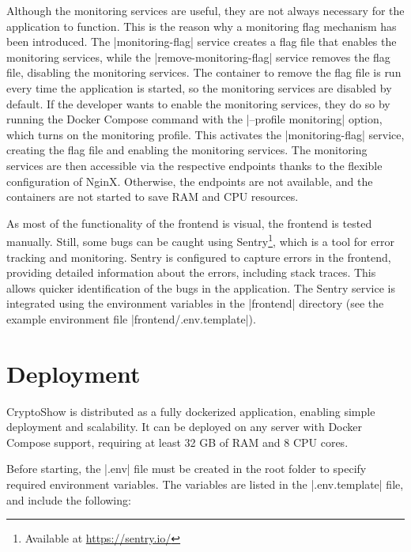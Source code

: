 Although the monitoring services are useful, they are not always necessary for the application to function. This is the reason why a monitoring flag mechanism has been introduced. The \inline|monitoring-flag| service creates a flag file that enables the monitoring services, while the \inline|remove-monitoring-flag| service removes the flag file, disabling the monitoring services. The container to remove the flag file is run every time the application is started, so the monitoring services are disabled by default. If the developer wants to enable the monitoring services, they do so by running the Docker Compose command with the \inline|--profile monitoring| option, which turns on the monitoring profile. This activates the \inline|monitoring-flag| service, creating the flag file and enabling the monitoring services. The monitoring services are then accessible via the respective endpoints thanks to the flexible configuration of NginX. Otherwise, the endpoints are not available, and the containers are not started to save RAM and CPU resources.

As most of the functionality of the frontend is visual, the frontend is tested manually. Still, some bugs can be caught using Sentry\footnote{Available at \url{https://sentry.io/}}, which is a tool for error tracking and monitoring. Sentry is configured to capture errors in the frontend, providing detailed information about the errors, including stack traces. This allows quicker identification of the bugs in the application. The Sentry service is integrated using the environment variables in the \inline|frontend| directory (see the example environment file \inline|frontend/.env.template|).

\section{Deployment}
\label{sec:deployment}

CryptoShow is distributed as a fully dockerized application, enabling simple deployment and scalability. It can be deployed on any server with Docker Compose support, requiring at least 32 GB of RAM and 8 CPU cores.

Before starting, the \inline|.env| file must be created in the root folder to specify required environment variables. The variables are listed in the \inline|.env.template| file, and include the following:

